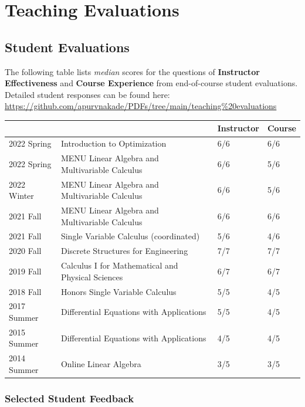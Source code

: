 \documentclass[
]{report}
\begin{document}
\hypertarget{teaching-evaluations}{%
\chapter{Teaching Evaluations}\label{teaching-evaluations}}

\hypertarget{student-evaluations}{%
\section{Student Evaluations}\label{student-evaluations}}

The following table lists \emph{median} scores for the questions of \textbf{Instructor Effectiveness} and \textbf{Course Experience} from end-of-course student evaluations. Detailed student responses can be found here: \url{https://github.com/apurvnakade/PDFs/tree/main/teaching\%20evaluations}

\begin{longtable}[]{@{}llll@{}}
\toprule
& & Instructor & Course\tabularnewline
\midrule
\endhead
2022 Spring & Introduction to Optimization & 6/6 & 6/6\tabularnewline
2022 Spring & MENU Linear Algebra and Multivariable Calculus & 6/6 & 5/6\tabularnewline
2022 Winter & MENU Linear Algebra and Multivariable Calculus & 6/6 & 5/6\tabularnewline
2021 Fall & MENU Linear Algebra and Multivariable Calculus & 6/6 & 6/6\tabularnewline
2021 Fall & Single Variable Calculus (coordinated) & 5/6 & 4/6\tabularnewline
2020 Fall & Discrete Structures for Engineering & 7/7 & 7/7\tabularnewline
2019 Fall & Calculus I for Mathematical and Physical Sciences & 6/7 & 6/7\tabularnewline
2018 Fall & Honors Single Variable Calculus & 5/5 & 4/5\tabularnewline
2017 Summer & Differential Equations with Applications & 5/5 & 4/5\tabularnewline
2015 Summer & Differential Equations with Applications & 4/5 & 4/5\tabularnewline
2014 Summer & Online Linear Algebra & 3/5 & 3/5\tabularnewline
\bottomrule
\end{longtable}

\hypertarget{selected-student-feedback}{%
\subsection*{Selected Student Feedback}\label{selected-student-feedback}}
\end{document}
